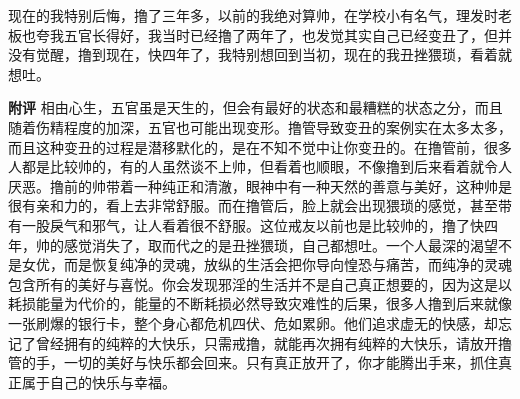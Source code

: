 \begin{case}
    现在的我特别后悔，撸了三年多，以前的我绝对算帅，在学校小有名气，理发时老板也夸我五官长得好，我当时已经撸了两年了，也发觉其实自己已经变丑了，但并没有觉醒，撸到现在，快四年了，我特别想回到当初，现在的我丑挫猥琐，看着就想吐。

    \textbf{附评} 相由心生，五官虽是天生的，但会有最好的状态和最糟糕的状态之分，而且随着伤精程度的加深，五官也可能出现变形。撸管导致变丑的案例实在太多太多，而且这种变丑的过程是潜移默化的，是在不知不觉中让你变丑的。在撸管前，很多人都是比较帅的，有的人虽然谈不上帅，但看着也顺眼，不像撸到后来看着就令人厌恶。撸前的帅带着一种纯正和清澈，眼神中有一种天然的善意与美好，这种帅是很有亲和力的，看上去非常舒服。而在撸管后，脸上就会出现猥琐的感觉，甚至带有一股戾气和邪气，让人看着很不舒服。这位戒友以前也是比较帅的，撸了快四年，帅的感觉消失了，取而代之的是丑挫猥琐，自己都想吐。一个人最深的渴望不是女优，而是恢复纯净的灵魂，放纵的生活会把你导向惶恐与痛苦，而纯净的灵魂包含所有的美好与喜悦。你会发现邪淫的生活并不是自己真正想要的，因为这是以耗损能量为代价的，能量的不断耗损必然导致灾难性的后果，很多人撸到后来就像一张刷爆的银行卡，整个身心都危机四伏、危如累卵。他们追求虚无的快感，却忘记了曾经拥有的纯粹的大快乐，只需戒撸，就能再次拥有纯粹的大快乐，请放开撸管的手，一切的美好与快乐都会回来。只有真正放开了，你才能腾出手来，抓住真正属于自己的快乐与幸福。
\end{case}

